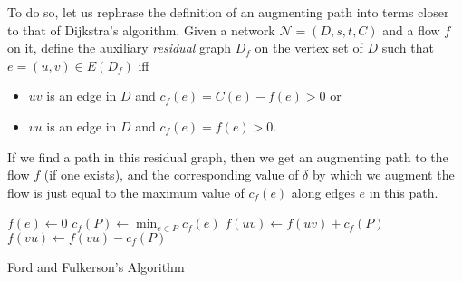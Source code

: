 			To do so, let us rephrase the definition of an augmenting path into terms closer to that of Dijkstra's algorithm.
			Given a network $\mathcal{N}=(D,s,t,C)$ and a flow $f$ on it, define the auxiliary \emph{residual} graph $D_f$ on the vertex set of $D$ such that $e = (u,v)\in E(D_f)$ iff
			\begin{itemize}
				\item $uv$ is an edge in $D$ and $c_f(e) = C(e) - f(e) > 0$ or
				\item $vu$ is an edge in $D$ and $c_f(e) = f(e) > 0$.
			\end{itemize}
			If we find a path in this residual graph, then we get an augmenting path to the flow $f$ (if one exists), and the corresponding value of $\delta$ by which we augment the flow is just equal to the maximum value of $c_f(e)$ along edges $e$ in this path.

			\begin{algorithm}[H]
				\DontPrintSemicolon
				\SetNoFillComment

				 {
					$f(e)\gets 0$
				}
				 {
					$c_f(P)\gets\min_{e \in P} c_f(e)$\;
					 {
						 {
							$f(uv)\gets f(uv) + c_f(P)$
						} {
							$f(vu) \gets f(vu) - c_f(P)$
						}
					}
				}
				\;
				\caption{Ford and Fulkerson's Algorithm}\label{algo: max flow}
			\end{algorithm}

